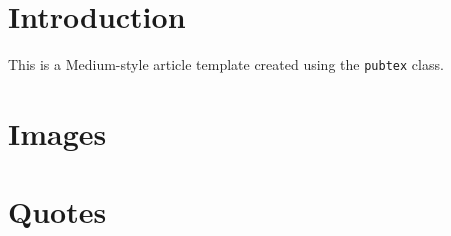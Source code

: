 \documentclass{pubtex-medium}
\begin{document}

\section{Introduction}
This is a Medium-style article template created using the \texttt{pubtex} class.

\section{Images}


\section{Quotes}

\end{document}
